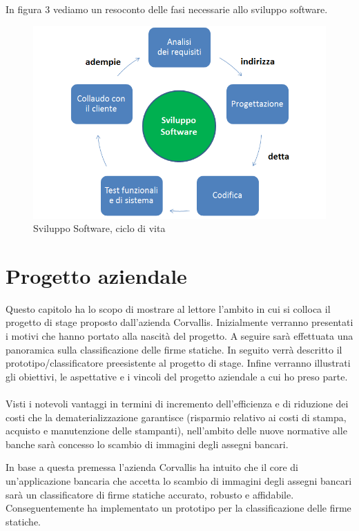 In figura 3 vediamo un resoconto delle fasi necessarie allo sviluppo software.
\begin{figure}[h!]
\centering
\includegraphics[scale=0.55]{../Logo&Header/sviluppoSoftware.png}
\caption{ Sviluppo Software, ciclo di vita}
\end{figure}

\newpage
\newpage

\section{Progetto aziendale}
\label{2.0}
Questo capitolo ha lo scopo di mostrare al lettore l'ambito in cui si colloca il progetto di stage proposto dall'azienda Corvallis. Inizialmente verranno presentati i motivi che hanno portato alla nascità del progetto. A seguire sarà effettuata una panoramica sulla classificazione delle firme statiche. In seguito verrà descritto il prototipo/classificatore preesistente al progetto di stage. Infine verranno illustrati gli obiettivi, le aspettative e i vincoli del progetto aziendale a cui ho preso parte.\\\\
Visti i notevoli vantaggi in termini di incremento dell'efficienza e di riduzione dei costi che la dematerializzazione garantisce (risparmio relativo ai costi di stampa, acquisto e manutenzione delle stampanti), nell'ambito delle nuove normative alle banche sarà concesso lo scambio di immagini degli assegni bancari. 

In base a questa premessa l'azienda Corvallis ha intuito che il core di un'applicazione bancaria che accetta lo scambio di immagini degli assegni bancari sarà un classificatore di firme statiche accurato, robusto e affidabile. Conseguentemente ha implementato un prototipo per la classificazione delle firme statiche.

